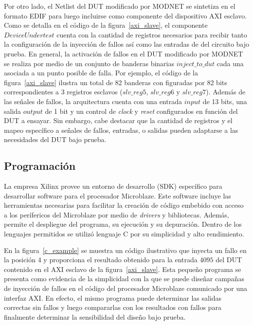 \documentclass[a4paper,openright,12pt]{report}
\begin{document}
Por otro lado, el Netlist del DUT modificado por MODNET se sintetiza en el formato EDIF para luego incluirse como componente del dispositivo AXI esclavo. Como se detalla en el código de la figura~\ref{axi_slave}, el componente $DeviceUnder\textit{test}$ cuenta con la cantidad de registros necesarios para recibir tanto la configuración de la inyección de fallos así como las entradas de del circuito bajo prueba. En general, la activación de fallos en el DUT modificado por MODNET se realiza por medio de un conjunto de banderas binarias $inject\_to\_dut$ cada una asociada a un punto posible de falla. Por ejemplo, el código de la figura~\ref{axi_slave} ilustra un total de 82 banderas con figuradas por 82 bits correspondientes a 3 registros esclavos ($slv\_reg5$, $slv\_reg6$ y $slv\_reg7$). Además de las señales de fallos, la arquitectura cuenta con una entrada $input$ de 13 bits, una salida $output$ de 1 bit y un control de \textit{clock} y \textit{reset} configurados en función del DUT a ensayar. Sin embargo, cabe destacar que la cantidad de registros y el mapeo específico a señales de fallos, entradas, o salidas  pueden adaptarse a las necesidades del DUT bajo prueba. 

\subsection{Programación}

La empresa Xilinx provee un entorno de desarrollo (SDK) específico para desarrollar software para el procesador Microblaze. Este software incluye las herramientas necesarias para facilitar la creación de código embebido con acceso a los perífericos del Microblaze por medio de \textit{drivers} y bibliotecas. Además, permite el despliegue del programa, su ejecución y su depuración. Dentro de los lenguajes permitidos se utilizó lenguaje C por su simplicidad y alto rendimiento. 

En la figura~\ref{c_example} se muestra un código ilustrativo que inyecta un fallo en la posición 4 y proporciona el resultado obtenido para la entrada $4095$ del DUT contenido en el AXI esclavo de la figura~\ref{axi_slave}. Esta pequeño programa se presenta como evidencia de la simplicidad con la que se puede diseñar campañas de inyección de fallos en el código del procesador Microblaze comunicado por una interfaz AXI. En efecto, el mismo programa puede determinar las salidas correctas sin fallos y luego compararlas con los resultados con fallos para finalmente determinar la sensibilidad del diseño bajo prueba.
\end{document}
